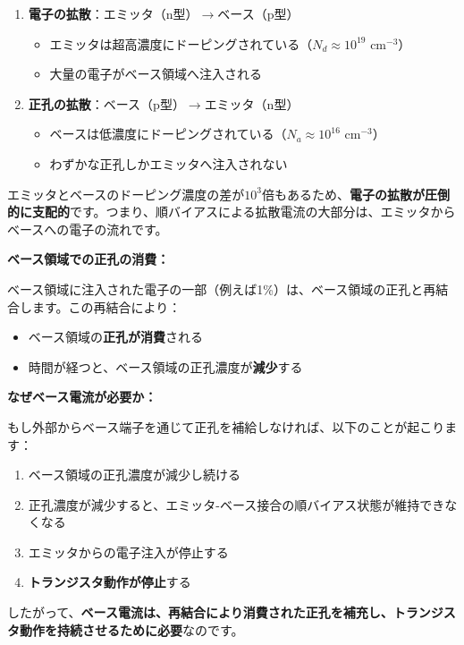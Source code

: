 \begin{enumerate}
\item \textbf{電子の拡散}：エミッタ（n型）$\rightarrow$ベース（p型）
\begin{itemize}
\item エミッタは超高濃度にドーピングされている（$N_d \approx 10^{19}$ cm$^{-3}$）
\item 大量の電子がベース領域へ注入される
\end{itemize}

\item \textbf{正孔の拡散}：ベース（p型）$\rightarrow$エミッタ（n型）
\begin{itemize}
\item ベースは低濃度にドーピングされている（$N_a \approx 10^{16}$ cm$^{-3}$）
\item わずかな正孔しかエミッタへ注入されない
\end{itemize}
\end{enumerate}

エミッタとベースのドーピング濃度の差が$10^3$倍もあるため、\textbf{電子の拡散が圧倒的に支配的}です。つまり、順バイアスによる拡散電流の大部分は、エミッタからベースへの電子の流れです。

\textbf{ベース領域での正孔の消費：}

ベース領域に注入された電子の一部（例えば1\%）は、ベース領域の正孔と再結合します。この再結合により：

\begin{itemize}
\item ベース領域の\textbf{正孔が消費}される
\item 時間が経つと、ベース領域の正孔濃度が\textbf{減少}する
\end{itemize}

\textbf{なぜベース電流が必要か：}

もし外部からベース端子を通じて正孔を補給しなければ、以下のことが起こります：

\begin{enumerate}
\item ベース領域の正孔濃度が減少し続ける
\item 正孔濃度が減少すると、エミッタ-ベース接合の順バイアス状態が維持できなくなる
\item エミッタからの電子注入が停止する
\item \textbf{トランジスタ動作が停止}する
\end{enumerate}

したがって、\textbf{ベース電流は、再結合により消費された正孔を補充し、トランジスタ動作を持続させるために必要}なのです。

